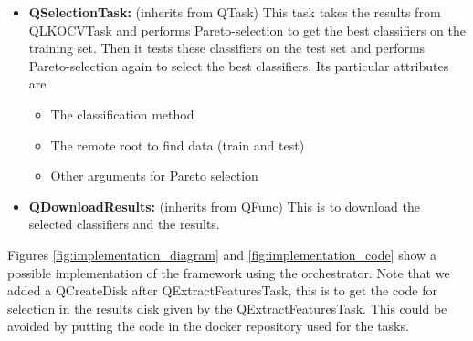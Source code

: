 \documentclass[10pt, conference, compsocconf]{IEEEtran}
\begin{document}
\begin{itemize}
\begin{itemize}
  \end{itemize}
\item \textbf{QSelectionTask:} (inherits from QTask) This task takes the results from QLKOCVTask and performs Pareto-selection to get the best classifiers on the training set. Then it tests these classifiers on the test set and performs Pareto-selection again to select the best classifiers.
  Its particular attributes are
  \begin{itemize}
  \item The classification method
  \item The remote root to find data (train and test)
  \item Other arguments for Pareto selection
  \end{itemize}
\item \textbf{QDownloadResults:} (inherits from QFunc) This is to download the selected classifiers and the results.
\end{itemize}
Figures \ref{fig:implementation_diagram} and \ref{fig:implementation_code} show a possible implementation of the framework using the orchestrator. Note that we added a QCreateDisk after QExtractFeaturesTask, this is to get the code for selection in the results disk given by the QExtractFeaturesTask. This could be avoided by putting the code in the docker repository used for the tasks.
\end{document}
